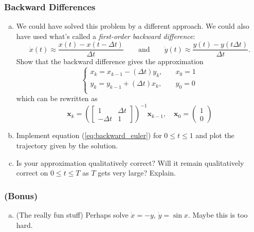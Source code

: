 \subsubsection*{Backward Differences}
\begin{enumerate}[(a),resume]
    \item We could have solved this problem by a different approach. We could also have used what's called a \textit{first-order backward difference}:
    \begin{equation} 
    \label{eq:backward_difference}
    \dot{x}(t) \approx \frac{x(t) - x(t - \Delta t)}{\Delta t} \qquad \text{and} \qquad \dot{y}(t) \approx \frac{y(t) - y(t  \Delta t)}{\Delta t}.
    \end{equation}
    Show that the backward difference gives the approximation
    \begin{equation}
    \label{eq:backward_euler}
     \begin{cases} x_{k} = x_{k-1} - (\Delta t) y_k, & \quad x_0 = 1\\  y_{k} = y_{k-1} + (\Delta t) x_k, & \quad y_0 = 0\\  \end{cases}
    \end{equation}
    which can be rewritten as
   \begin{equation*} 
    \bm{x}_{k} 
    = \left(\begin{bmatrix} 1 & \Delta t \\  -\Delta t & 1\end{bmatrix}\right)^{-1} \bm{x}_{k-1}, \quad \bm{x}_0 = \begin{pmatrix} 1\\0 \end{pmatrix}
    \end{equation*}
    \item Implement equation (\ref{eq:backward_euler}) for $0 \leq t \leq 1$ and plot the trajectory given by the solution. 
    \item Is your approximation qualitatively correct? Will it remain qualitatively correct on $0 \leq t \leq T$ as $T$ gets very large? Explain.
\end{enumerate}
\subsubsection*{(Bonus)}
\begin{enumerate}[(a),resume]
    \item (The really fun stuff) Perhaps solve $\dot{x} = -y$, $\dot{y} = \sin x$.  Maybe this is too hard.
\end{enumerate}
\newpage

